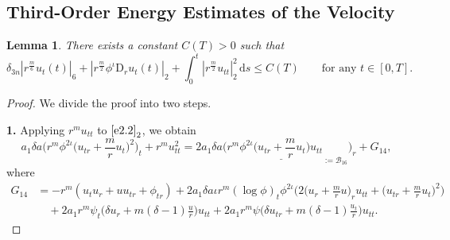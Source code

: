 \documentclass[11pt,reqno]{amsart}
\newtheorem{lem}{Lemma}[section]
\numberwithin{rk}{section}
\numberwithin{prop}{section}
\numberwithin{mydef}{section}
\numberwithin{lem}{section}
\numberwithin{equation}{section}
\numberwithin{thm}{section}
\begin{document}
\subsection{Third-Order Energy Estimates of the Velocity}
\begin{lem}\label{l4.10}  
There exists a constant $C(T)>0$ such that
\begin{equation*}
\delta_{3n}|r^\frac{m}{6}u_t(t)|_6+|r^{\frac{m}{2}}\phi^\iota\mathrm{D}_r u_t(t)|_2+\int_{0}^{t}  |r^{\frac{m}{2}}u_{tt}|^2_2 \,\mathrm{d}s\leq C(T)
\qquad\text{for any $t\in [0,T]$}.
\end{equation*}
\end{lem}

\begin{proof}
We divide the proof into two steps.

\smallskip 
\textbf{1.} Applying $r^mu_{tt}$ to $\eqref{e2.2}_2$, we obtain 
\begin{equation}\label{dtg15}
a_1\delta a \Big(r^m\phi^{2\iota}\big(u_{tr}+\frac{m}{r}u_t\big)^2\Big)_t+r^mu_{tt}^2=2a_1\delta a\Big(r^m\underline{\phi^{2\iota}\big(u_{tr}+\frac{m}{r}u_t\big)u_{tt}}_{:=\mathcal{B}_{16}}\Big)_r+G_{14},
\end{equation}
where
\begin{equation*}
\begin{aligned}
G_{14}&=-r^m(u_tu_r+uu_{tr}+\phi_{tr})  +2a_1 \delta a \iota r^m(\log\phi)_t \phi^{2\iota}\Big(2\big(u_r+\frac{m}{r}u\big)_r u_{tt}+ \big(u_{tr}+\frac{m}{r}u_t\big)^2\Big)\\
&\quad +2a_1  r^m\psi_t\big(\delta u_r+m(\delta-1)\frac{u}{r}\big)u_{tt} +2a_1  r^m\psi \big(\delta u_{tr}+m(\delta-1)\frac{u_t}{r}\big)u_{tt}.
\end{aligned}
\end{equation*}



\end{proof}
\end{document}
